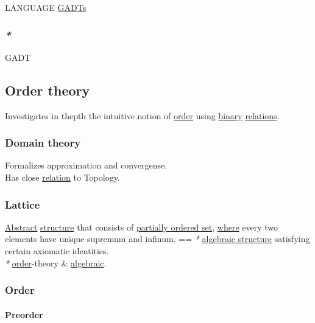 \documentclass[11pt]{article}
\begin{document}
LANGUAGE \hyperref[org04473bc]{GADTs}\\

\subsubsection{\emph{*}}
\label{sec:orge930fd9}

\label{orge23d150}GADT\\

\subsection{\label{orgfacfd32}Order theory}
\label{sec:orgf9fb07f}

Investigates in thepth the intuitive notion of \hyperref[org8544276]{order} using \hyperref[orgee106ab]{binary} \hyperref[org5e14e7d]{relations}.\\

\subsubsection{\label{org35554e5}Domain theory}
\label{sec:org74af97f}

Formalizes approximation and convergense.\\
Has close \hyperref[org6e8ae46]{relation} to Topology.\\

\subsubsection{\label{org41be899}Lattice}
\label{sec:orga626d5c}

\hyperref[org606d002]{Abstract} \hyperref[org93ee82c]{structure} that consists of \hyperref[org63f1dad]{partially ordered set}, \hyperref[orgefd1ecd]{where} every two elements have unique supremum and infinum. == \emph{*} \hyperref[org461d8c5]{algebraic structure} satisfying certain axiomatic identities.\\
\emph{*} \hyperref[org8544276]{order}-theory \& \hyperref[orgf3466c3]{algebraic}.\\

\subsubsection{\label{org8544276}Order}
\label{sec:org369236c}

\paragraph{\label{org49f2aed}Preorder}
\label{sec:orgde46dd7}
\end{document}
